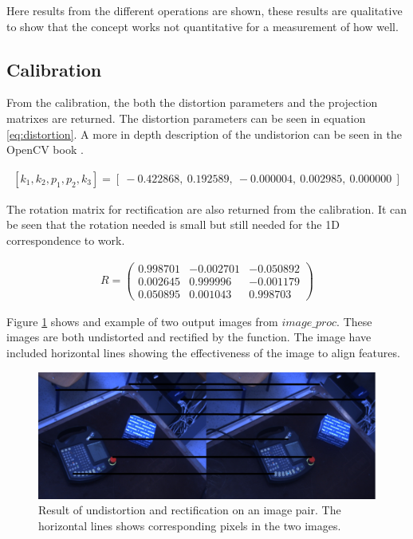 Here results from the different operations are shown, these results are qualitative to show that the concept works not quantitative for a measurement of how well.

\subsection{Calibration}

From the calibration, the both the distortion parameters and the projection matrixes are returned. The distortion parameters can be seen in equation \ref{eq:distortion}. A more in depth description of the undistorion can be seen in the OpenCV book \cite{locv}.





\begin{equation}\label{eq:distortion}
\begin{split}
[ k_{1}, k_{2}, p_{1}, p_{2}, k_{3} ] = [\ -0.422868,\ 0.192589,\ -0.000004,\ 0.002985,\ 0.000000\ ]
\end{split}
\end{equation} 

The rotation matrix for rectification are also returned from the calibration. It can be seen that the rotation needed is small but still needed for the 1D correspondence to work. 

\begin{equation}\label{eq:distortion}
\begin{split}
R =
 \begin{pmatrix}
  0.998701 & -0.002701 & -0.050892 \\
  0.002645 & 0.999996 & -0.001179 \\
  0.050895 & 0.001043 & 0.998703 
 \end{pmatrix}
\end{split}
\end{equation}

Figure \ref{fig:rectified} shows and example of two output images from $image\_proc$. These images are both undistorted and rectified by the function. The image have included horizontal lines showing the effectiveness of the image to align features.

\begin{figure}[h!]
  \centering
    \includegraphics[width=\textwidth]{graphics/06_vision/rectified.jpg}
      \caption{Result of undistortion and rectification on an image pair. The horizontal lines shows corresponding pixels in the two images.}
    \label{fig:rectified}
\end{figure}

